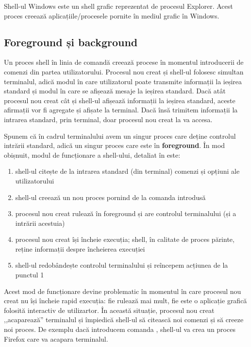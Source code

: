 Shell-ul Windows este un shell grafic reprezentat de procesul Explorer. Acest
proces creează aplicațiile/procesele pornite în mediul grafic în Windows.

\subsection{Foreground și background}
\label{sec:process-ierarhie-foreground-background}

Un proces shell în linia de comandă creează procese în momentul introducerii de
comenzi din partea utilizatorului. Procesul nou creat și shell-ul folosesc
simultan terminalul, adică modul în care utilizatorul poate transmite informații
la ieșirea standard și modul în care se afișează mesaje la ieșirea standard.
Dacă atât procesul nou creat cât și shell-ul afișează informații la ieșirea
standard, aceste afirmații vor fi agregate și afișate la terminal. Dacă însă
trimitem informații la intrarea standard, prin terminal, doar procesul nou creat
la va accesa.

Spunem că în cadrul terminalului avem un singur proces care deține controlul
intrării standard, adică un singur proces care este în \textbf{foreground}. În
mod obișnuit, modul de funcționare a shell-ului, detaliat în  este:

\begin{enumerate}
	\item shell-ul citește de la intrarea standard (din terminal) comenzi și
		opțiuni ale utilizatorului
	\item shell-ul creează un nou proces pornind de la comanda introdusă
	\item procesul nou creat rulează în foreground și are controlul
		terminalului (și a intrării acestuia)
	\item procesul nou creat își încheie execuția; shell, în calitate de
		proces părinte, reține informații despre încheierea execuției
	\item shell-ul redobândește controlul terminalului și reîncepem acțiunea
		de la punctul 1
\end{enumerate}

Acest mod de funcționare devine problematic în momentul în care procesul nou
creat nu își încheie rapid execuția: fie rulează mai mult, fie este o aplicație
grafică folosită interactiv de utilizartor. În această situație, procesul nou
creat ,,acaparează'' terminalul și împiedică shell-ul să citească noi comenzi și
să creeze noi proces. De exemplu dacă introducem comanda , shell-ul va
crea un proces Firefox care va acapara terminalul.

